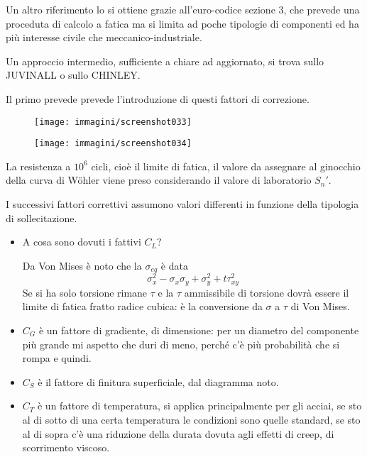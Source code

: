 \documentclass{article}
\begin{document}
\begin{adjustwidth}{2in}{}
				Un altro riferimento lo si ottiene grazie all'euro-codice sezione 3, che prevede una proceduta di calcolo a fatica ma si limita ad poche tipologie di componenti ed ha più interesse civile che meccanico-industriale. \newpage
								
				Un approccio intermedio, sufficiente a chiare ad aggiornato, si trova sullo JUVINALL o sullo CHINLEY. 
				
				Il primo prevede prevede l'introduzione di questi fattori di correzione. 
				\begin{figure}[H]
					\centering
					\texttt{[image: immagini/screenshot033]}
					\label{fig:screenshot033}
				\end{figure}
				\begin{figure}[H]
					\centering
					\texttt{[image: immagini/screenshot034]}
					\label{fig:screenshot034}
				\end{figure}
												
				La resistenza a $10^6$ cicli, cioè il limite di fatica, il valore da assegnare al ginocchio della curva di Wöhler viene preso considerando il valore di laboratorio $S_n'$.
				
				I successivi fattori correttivi assumono valori differenti in funzione della tipologia di sollecitazione.  
				
				\begin{itemize}
					\item A cosa sono dovuti i fattivi $C_L?$
				
				Da Von Mises è noto che la $\sigma_{eq}$ è data 
				\[\sigma_x^2 - \sigma_x\sigma_y + \sigma_y ^2+ t\tau^2_{xy}\] 
				Se si ha solo torsione rimane $\tau$ e la $\tau$ ammissibile di torsione dovrà essere il limite di fatica fratto radice cubica: è la conversione da $\sigma$ a $\tau$ di Von Mises. 
				
				\item $C_G$ è un fattore di gradiente, di dimensione: per un diametro del componente più grande mi aspetto che duri di meno, perché c'è più probabilità che si rompa e quindi.
				
				\item $C_S$ è il fattore di finitura superficiale, dal diagramma noto. 
				
				\item $C_T$ è un fattore di temperatura, si applica principalmente per gli acciai, se sto al di sotto di una certa temperatura le condizioni sono quelle standard, se sto al di sopra c'è una riduzione della durata dovuta agli effetti di creep, di scorrimento viscoso.
				

\end{itemize}
\end{adjustwidth}
\end{document}
